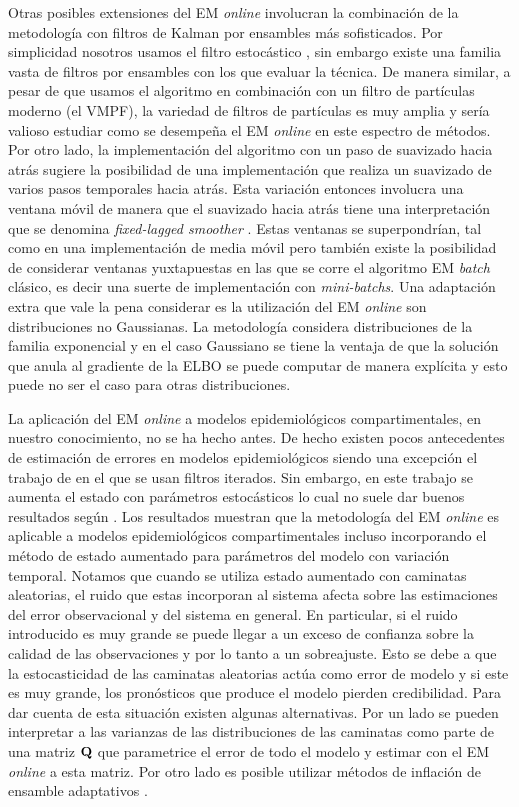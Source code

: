 Otras posibles extensiones del EM \textit{online} involucran la combinación de la metodología con filtros de Kalman por ensambles más sofisticados. Por simplicidad nosotros usamos el filtro estocástico \citep{Burgers1998}, sin embargo existe una familia vasta de filtros por ensambles con los que evaluar la técnica. De manera similar, a pesar de que usamos el algoritmo en combinación con un filtro de partículas moderno (el VMPF), la variedad de filtros de partículas es muy amplia y sería valioso estudiar como se desempeña el EM \textit{online} en este espectro de métodos. Por otro lado, la implementación del algoritmo con un paso de suavizado hacia atrás sugiere la posibilidad de una implementación que realiza un suavizado de varios pasos temporales hacia atrás. Esta variación entonces involucra una ventana móvil de manera que el suavizado hacia atrás tiene una interpretación que se denomina \textit{fixed-lagged smoother} \citep{Cosme2012}. Estas ventanas se superpondrían, tal como en una implementación de media móvil pero también existe la posibilidad de considerar ventanas yuxtapuestas en las que se corre el algoritmo EM \textit{batch} clásico, es decir una suerte de implementación con \textit{mini-batchs}. Una adaptación extra que vale la pena considerar es la utilización del EM \textit{online} son distribuciones no Gaussianas. La metodología considera distribuciones de la familia exponencial y en el caso Gaussiano se tiene la ventaja de que la solución que anula al gradiente de la ELBO se puede computar de manera explícita y esto puede no ser el caso para otras distribuciones.

La aplicación del EM \textit{online} a modelos epidemiológicos compartimentales, en nuestro conocimiento, no se ha hecho antes. De hecho existen pocos antecedentes de estimación de errores en modelos epidemiológicos siendo una excepción el trabajo de \cite{Ionides2006} en el que se usan filtros iterados. Sin embargo, en este trabajo se aumenta el estado con parámetros estocásticos lo cual no suele dar buenos resultados según \cite{Delsole2010}. Los resultados muestran que la metodología del EM \textit{online} es aplicable a modelos epidemiológicos compartimentales incluso incorporando el método de estado aumentado para parámetros del modelo con variación temporal. Notamos que cuando se utiliza estado aumentado con caminatas aleatorias, el ruido que estas incorporan al sistema afecta sobre las estimaciones del error observacional y del sistema en general. En particular, si el ruido introducido es muy grande se puede llegar a un exceso de confianza sobre la calidad de las observaciones y por lo tanto a un sobreajuste. Esto se debe a que la estocasticidad de las caminatas aleatorias actúa como error de modelo y si este es muy grande, los pronósticos que produce el modelo pierden credibilidad. Para dar cuenta de esta situación existen algunas alternativas. Por un lado se pueden interpretar a las varianzas de las distribuciones de las caminatas como parte de una matriz $\mathbf{Q}$ que parametrice el error de todo el modelo y estimar con el EM \textit{online} a esta matriz. Por otro lado es posible utilizar métodos de inflación de ensamble adaptativos \citep{Ruiz2013b}.

